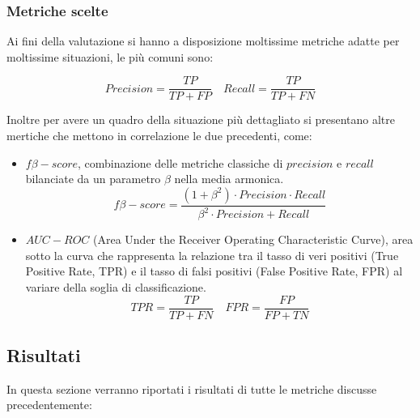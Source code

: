 \documentclass[italian,12pt,a4paper]{article}
\begin{document}
	
	\subsubsection{Metriche scelte}
	Ai fini della valutazione si hanno a disposizione moltissime metriche adatte per moltissime situazioni, le più comuni sono:
	
	$$Precision = \frac{TP}{TP+FP} \quad Recall = \frac{TP}{TP+FN}$$

	Inoltre per avere un quadro della situazione più dettagliato si presentano altre mertiche che mettono in correlazione le due precedenti, come:
	
		
	\begin{itemize}
		\item $f\beta-score$,  combinazione delle metriche classiche di $precision$ e $recall$ bilanciate da un parametro $\beta$ nella media armonica.
		$$f\beta-score = \frac{(1+ \beta^2) \cdot Precision \cdot Recall}{\beta^2 \cdot Precision + Recall}$$
		\item $AUC-ROC$ (Area Under the Receiver Operating Characteristic Curve), area sotto la curva che rappresenta la relazione tra il tasso di veri positivi (True Positive Rate, TPR) e il tasso di falsi positivi (False Positive Rate, FPR) al variare della soglia di classificazione.
		$$TPR = \frac{TP}{TP+FN} \quad FPR = \frac{FP}{FP+TN}$$
	
	\end{itemize} 

	\subsection{Risultati}
		In questa sezione verranno riportati i risultati di tutte le metriche discusse precedentemente:
	
\end{document}
